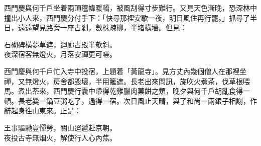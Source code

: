 西門慶與何千戶坐着兩頂氊幃暖轎，被風刮得寸步難行。又見天色漸晚，恐深林中撞出小人來，西門慶分付手下：「快尋那裡安歇一夜，明日風住再行罷。」抓尋了半日，遠遠望見路旁一座古剎，數株疎柳，半堵橫墻。但見：

\begin{myquote}
石砌碑橫夢草遮，迴廊古殿半欹斜。\\夜深宿客無燈火，月落安禪更可嗟。
\end{myquote}

西門慶與何千戶忙入寺中投宿，上題着「黃龍寺」。見方丈內幾個僧人在那裡坐禪，又無燈火，房舍都毀壞，半用籬遮。{}長老出來問訊，旋吹火煮茶，伐草根喂馬。煮出茶來，西門慶行囊中帶得乾雞臘肉菓餅之類，晚夕與何千戶胡亂食得一頓。長老爨一鍋豆粥吃了，過得一宿。次日風止天晴，與了和尚一兩銀子相謝，作辭起身徃山東來。正是：

\begin{myquote}
王事驅馳豈憚勞，關山迢遞赴京朝。\\夜投古寺無烟火，解使行人心內焦。
\end{myquote}

